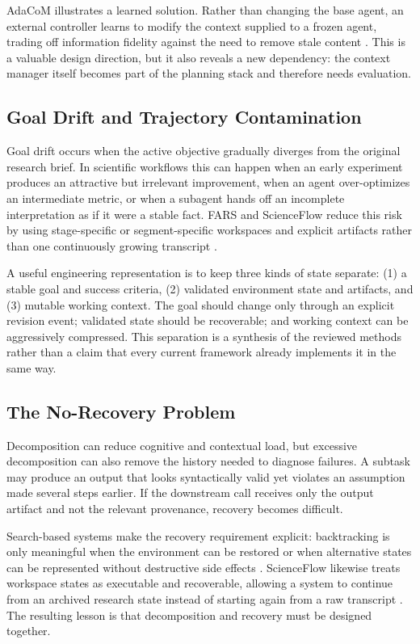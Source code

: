 \documentclass[manuscript,screen]{acmart}
\begin{document}
AdaCoM illustrates a learned solution. Rather than changing the base agent, an external controller learns to modify the context supplied to a frozen agent, trading off information fidelity against the need to remove stale content \cite{yi2026adacom}. This is a valuable design direction, but it also reveals a new dependency: the context manager itself becomes part of the planning stack and therefore needs evaluation.

\subsection{Goal Drift and Trajectory Contamination}
Goal drift occurs when the active objective gradually diverges from the original research brief. In scientific workflows this can happen when an early experiment produces an attractive but irrelevant improvement, when an agent over-optimizes an intermediate metric, or when a subagent hands off an incomplete interpretation as if it were a stable fact. FARS and ScienceFlow reduce this risk by using stage-specific or segment-specific workspaces and explicit artifacts rather than one continuously growing transcript \cite{tang2026fars,zhao2026scienceflow}.

A useful engineering representation is to keep three kinds of state separate: (1) a stable goal and success criteria, (2) validated environment state and artifacts, and (3) mutable working context. The goal should change only through an explicit revision event; validated state should be recoverable; and working context can be aggressively compressed. This separation is a synthesis of the reviewed methods rather than a claim that every current framework already implements it in the same way.

\subsection{The No-Recovery Problem}
Decomposition can reduce cognitive and contextual load, but excessive decomposition can also remove the history needed to diagnose failures. A subtask may produce an output that looks syntactically valid yet violates an assumption made several steps earlier. If the downstream call receives only the output artifact and not the relevant provenance, recovery becomes difficult.

Search-based systems make the recovery requirement explicit: backtracking is only meaningful when the environment can be restored or when alternative states can be represented without destructive side effects \cite{zhou2023lats}. ScienceFlow likewise treats workspace states as executable and recoverable, allowing a system to continue from an archived research state instead of starting again from a raw transcript \cite{zhao2026scienceflow}. The resulting lesson is that decomposition and recovery must be designed together.
\end{document}
